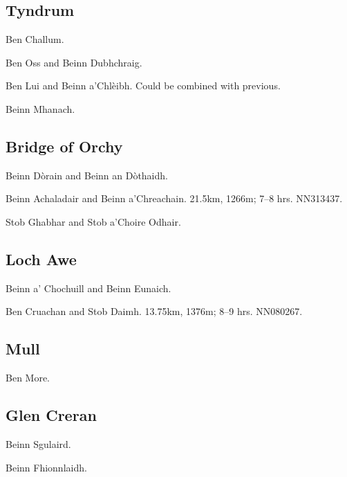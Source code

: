 
\subsection{Tyndrum}

\begin{munros}
\item Ben Challum.

\item Ben Oss and Beinn Dubhchraig.

\item\target Ben Lui and Beinn a'Chlèibh.  Could be combined with previous. 

\item Beinn Mhanach.
\end{munros}


\subsection{Bridge of Orchy}

\begin{munros}
\item Beinn Dòrain and Beinn an Dòthaidh.

\item \target Beinn Achaladair and Beinn a'Chreachain.  21.5km, 1266m; 7--8
  hrs.  NN313437. \tick

\item Stob Ghabhar and Stob a'Choire Odhair.

\end{munros}


\subsection{Loch Awe}

\begin{munros}
\item Beinn a' Chochuill and Beinn Eunaich.

\item \target Ben Cruachan and Stob Daimh.  13.75km, 1376m; 8--9 hrs.
  NN080267.  \tick
\end{munros}


\subsection{Mull}

\begin{munros}
\item Ben More.  \tick
\end{munros}


\subsection{Glen Creran}

\begin{munros}
\item Beinn Sgulaird.  \tick

\item Beinn Fhionnlaidh.  \tick
\end{munros}
